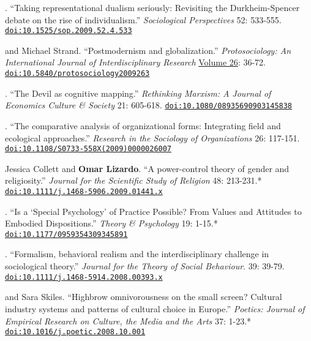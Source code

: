 
. ``Taking representational dualism seriously: Revisiting the Durkheim-Spencer debate on the rise of individualism.''  {\em Sociological Perspectives} 52: 533-555. \href{https://doi.org/10.1525/sop.2009.52.4.533}{\nolinkurl{doi:10.1525/sop.2009.52.4.533}}

 and Michael Strand. ``Postmodernism and globalization.'' {\em Protosociology: An International Journal of Interdisciplinary Research} \href{http://www.protosociology.de/Download/ProtoSociology-Vol26-S.pdf}{Volume 26}: 36-72. \href{https://doi.org/10.5840/protosociology2009263}{\nolinkurl{doi:10.5840/protosociology2009263}}

. ``The Devil as cognitive mapping.''  {\em Rethinking Marxism: A Journal of Economics Culture \& Society } 21: 605-618. \href{https://doi.org/10.1080/08935690903145838}{\nolinkurl{doi:10.1080/08935690903145838}}

. ``The comparative analysis of organizational forms:  Integrating field and ecological approaches.''  {\em Research in the Sociology of Organizations} 26: 117-151. \href{https://doi.org/10.1108/S0733-558X(2009)0000026007}{\nolinkurl{doi:10.1108/S0733-558X(2009)0000026007}}

\ind Jessica Collett and {\bf Omar Lizardo}. ``A power-control theory of gender and religiosity.'' {\em Journal for the Scientific Study of Religion} 48: 213-231.\textcolor{uclagold}{*} \href{https://doi.org/10.1111/j.1468-5906.2009.01441.x}{\nolinkurl{doi:10.1111/j.1468-5906.2009.01441.x}}

. ``Is a `Special Psychology' of Practice Possible? From Values and Attitudes to Embodied Dispositions.'' \emph{Theory \& Psychology} 19: 1-15.\textcolor{uclablue}{*} \href{https://doi.org/10.1177/0959354309345891}{\nolinkurl{doi:10.1177/0959354309345891}}

. ``Formalism, behavioral realism and the interdisciplinary challenge in sociological theory.'' {\em Journal for the Theory of Social Behaviour}.  39: 39-79. \href{https://doi.org/10.1111/j.1468-5914.2008.00393.x}{\nolinkurl{doi:10.1111/j.1468-5914.2008.00393.x}}

 and Sara Skiles. ``Highbrow omnivorousness on the small screen? Cultural industry systems and patterns of cultural choice in Europe.'' {\em Poetics: Journal of Empirical Research on Culture, the Media and the Arts} 37: 1-23.\textcolor{uclablue}{*} \href{https://doi.org/10.1016/j.poetic.2008.10.001}{\nolinkurl{doi:10.1016/j.poetic.2008.10.001}}